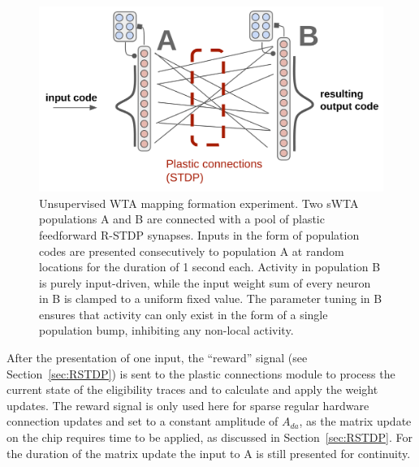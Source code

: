 \begin{figure}[h]
  \centering
    \includegraphics[width=\linewidth]{img/chapter5/Unsupervised_WTA_mapping.png}
    \caption[Unsupervised WTA mapping formation.]{Unsupervised WTA mapping formation experiment. Two sWTA populations A and B are connected with a pool of plastic feedforward R-STDP synapses. Inputs in the form of population codes are presented consecutively to population A at random locations for the duration of 1 second each. Activity in population B is purely input-driven, while the input weight sum of every neuron in B is clamped to a uniform fixed value. The parameter tuning in B ensures that activity can only exist in the form of a single population bump, inhibiting any non-local activity.}
  \label{fig:Unsupervised_WTA_mapping}
\end{figure}

After the presentation of one input, the ``reward'' signal (see Section~\ref{sec:RSTDP}) is sent to the plastic connections module to process the current state of the eligibility traces and to calculate and apply the weight updates. The reward signal is only used here for sparse regular hardware connection updates and set to a constant amplitude of $A_{da}$, as the matrix update on the chip requires time to be applied, as discussed in Section~\ref{sec:RSTDP}. For the duration of the matrix update the input to A is still presented for continuity.

